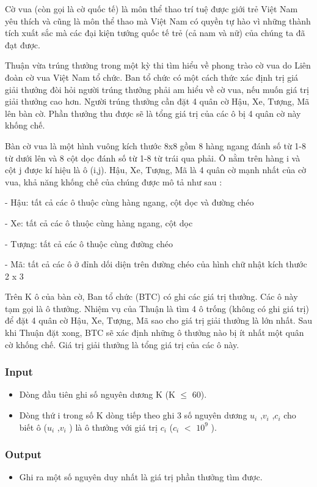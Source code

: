

Cờ vua (còn gọi là cờ quốc tế) là môn thể thao trí tuệ được giới trẻ Việt Nam yêu thích và cũng là môn thể thao mà Việt Nam có quyền tự hào vì những thành tích xuất sắc mà các đại kiện tướng quốc tế trẻ (cả nam và nữ) của chúng ta đã đạt được.

Thuận vừa trúng thưởng trong một kỳ thi tìm hiểu về phong trào cờ vua do Liên đoàn cờ vua Việt Nam tổ chức. Ban tổ chức có một cách thức xác định trị giá giải thưởng đòi hỏi người trúng thưởng phải am hiểu về cờ vua, nếu muốn giá trị giải thưởng cao hơn. Người trúng thưởng cần đặt 4 quân cờ Hậu, Xe, Tượng, Mã lên bàn cờ. Phần thưởng thu được sẽ là tổng giá trị của các ô bị 4 quân cờ này khống chế.

Bàn cờ vua là một hình vuông kích thước 8x8 gồm 8 hàng ngang đánh số từ 1-8 từ dưới lên và 8 cột dọc đánh số từ 1-8 từ trái qua phải. Ô nằm trên hàng i và cột j được kí hiệu là ô (i,j). Hậu, Xe, Tượng, Mã là 4 quân cờ mạnh nhất của cờ vua, khả năng khống chế của chúng được mô tả như sau :

- Hậu: tất cả các ô thuộc cùng hàng ngang, cột dọc và đường chéo

- Xe: tất cả các ô thuộc cùng hàng ngang, cột dọc

- Tượng: tất cả các ô thuộc cùng đường chéo

- Mã: tất cả các ô ở đỉnh dối diện trên đường chéo của hình chữ nhật kích thước 2 x 3

Trên K ô của bàn cờ, Ban tổ chức (BTC) có ghi các giá trị thưởng. Các ô này tạm gọi là ô thưởng. Nhiệm vụ của Thuận là tìm 4 ô trống (không có ghi giá trị) để đặt 4 quân cờ Hậu, Xe, Tượng, Mã sao cho giá trị giải thưởng là lớn nhất. Sau khi Thuận đặt xong, BTC sẽ xác định những ô thưởng nào bị ít nhất một quân cờ khống chế. Giá trị giải thưởng là tổng giá trị của các ô này.

\subsubsection{Input}
\begin{itemize}
	\item Dòng đầu tiên ghi số nguyên dương K (K  $\le$  60).
	\item Dòng thứ i trong số K dòng tiếp theo ghi 3 số nguyên dương $u_{i}$ ,$v_{i}$ ,$c_{i}$ cho biết ô ($u_{i}$ ,$v_{i}$ ) là ô thưởng với giá trị $c_{i}$ ($c_{i}$ $<$ $10^{9}$ ).
\end{itemize}

\subsubsection{Output}
\begin{itemize}
	\item Ghi ra một số nguyên duy nhất là giá trị phần thưởng tìm được.
\end{itemize}

